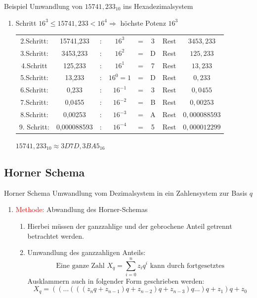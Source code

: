 \documentclass[12pt%
,aspectratio=169%
]{beamer}
\begin{document}
\begin{frame}{Beispiel}
Umwandlung von $15741,233_{10}$ ins Hexadezimalsystem
\begin{enumerate}
	\item Schritt $16^3 \leq 15741,233 < 16^4 \Rightarrow$ höchste Potenz $16^3$
\begin{table}[h]
\begin{tabular}{|c|c|c|c|c|c|c|c|}
\cline{1-8}
2.Schritt: & 15741,233 & : & $16^3$ & = & 3 & Rest & $3453,233$ \\ \cline{1-8}
3.Schritt: & 3453,233 & : & $16^2$ & = & D & Rest & $125,233$  \\ \cline{1-8}
4.Schritt & 125,233 & : & $16^1$ & = & 7 & Rest & $13,233$ \\ \cline{1-8}
5.Schritt: & 13,233 & : & $16^0=1$ & = &  D &  Rest & $0,233$ \\ \cline{1-8}
6.Schritt: & 0,233 & : & $16^{-1}$ & = &  3 &  Rest  & $0,0455$ \\ \cline{1-8}
7.Schritt: & 0,0455 & : & $16^{-2}$ & = &  B & Rest & $0,00253$ \\ \cline{1-8}
8.Schritt: & 0,00253 & : & $16^{-3}$ & = & A &  Rest & $0,000088593$ \\ \cline{1-8}
9. Schritt: & 0,000088593 & : & $16^{-4}$ & = & 5 & Rest &  $0,000012299$ \\ \cline{1-8}
\end{tabular}
\end{table}
\begin{center}
	\Rightarrow $15741,233_{10} \approx 3D7D,3BA5_{16}$
\end{center}
\end{enumerate}
\end{frame}

\subsection{Horner Schema}
\begin{frame}{Horner Schema}
Umwandlung vom Dezimalsystem in ein Zahlensystem zur Basis $q$
\begin{enumerate}\addtocounter{enumi}{1}
	\item \textcolor{red}{Methode:} Abwandlung des Horner-Schemas
	\begin{enumerate}
		\item Hierbei müssen der ganzzahlige und der gebrochene Anteil getrennt betrachtet werden.
		\item Umwandlung des ganzzahligen Anteils:
		$$
			\text{Eine ganze Zahl } X_q = \sum_{i=0}^n z_i q^i \text{ kann durch fortgesetztes}
		$$
		Ausklammern auch in folgender Form geschrieben werden:
		$$
			X_q = ((\ldots (((z_n q + z_{n-1}) q + z_{n-2}) q + z_{n-3}) q \ldots ) q + z_1) q + z_0
		$$
	\end{enumerate}
\end{enumerate}
\end{frame}
\end{document}
